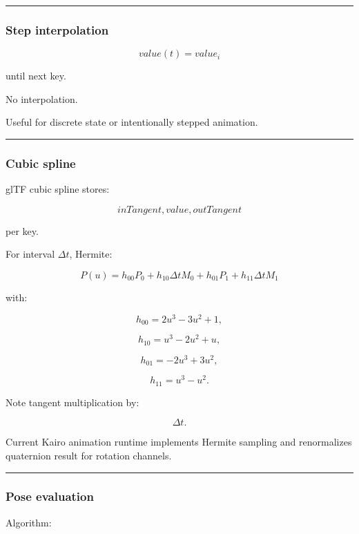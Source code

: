 \begin{center}\rule{0.5\linewidth}{0.5pt}\end{center}

\subsubsection{Step interpolation}\label{step-interpolation}

\[
value(t)=value_i
\]

until next key.

No interpolation.

Useful for discrete state or intentionally stepped animation.

\begin{center}\rule{0.5\linewidth}{0.5pt}\end{center}

\subsubsection{Cubic spline}\label{cubic-spline}

glTF cubic spline stores:

\[
inTangent,
value,
outTangent
\]

per key.

For interval \(\Delta t\), Hermite:

\[
P(u)
=
h_{00}P_0
+
h_{10}\Delta t M_0
+
h_{01}P_1
+
h_{11}\Delta t M_1
\]

with:

\[
h_{00}=2u^3-3u^2+1,
\]

\[
h_{10}=u^3-2u^2+u,
\]

\[
h_{01}=-2u^3+3u^2,
\]

\[
h_{11}=u^3-u^2.
\]

Note tangent multiplication by:

\[
\Delta t.
\]

Current Kairo animation runtime implements Hermite sampling and renormalizes quaternion result for rotation channels.

\begin{center}\rule{0.5\linewidth}{0.5pt}\end{center}

\subsubsection{Pose evaluation}\label{pose-evaluation}

Algorithm:

